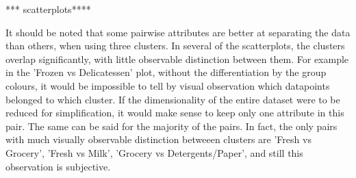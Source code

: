 \documentclass{article}
\newcommand{\imWidth}{8cm}
\begin{document}














*** scatterplots****

It should be noted that some pairwise attributes are better at separating the data than others, when using three clusters. In
several of the scatterplots, the clusters overlap significantly, with little observable distinction between them. For example in
the 'Frozen vs Delicatessen' plot, without the differentiation by the group colours, it would be impossible to tell by visual
observation which datapoints belonged to which cluster. If the dimensionality of the entire dataset were to be reduced for 
simplification, it would make sense to keep only one attribute in this pair. The same can be said for the majority of the pairs.
In fact, the only pairs with much visually observable distinction betweeen clusters are 'Fresh vs Grocery', 'Fresh vs Milk',
'Grocery vs Detergents/Paper', and still this observation is subjective. \\
\end{document}
